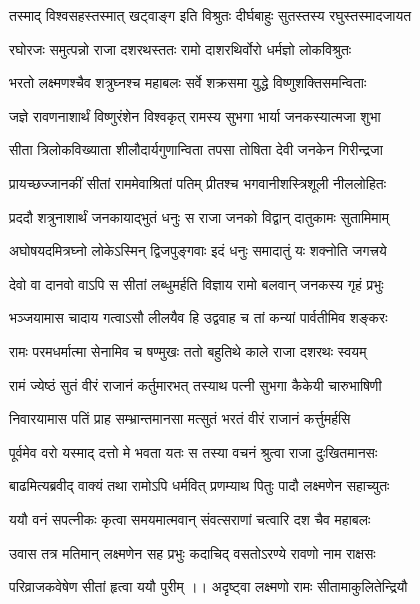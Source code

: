 \twolineshloka
{तस्माद् विश्वसहस्तस्मात् खट्वाङ्ग इति विश्रुतः}
{दीर्घबाहुः सुतस्तस्य रघुस्तस्मादजायत} %

\twolineshloka
{रघोरजः समुत्पन्नो राजा दशरथस्ततः}
{रामो दाशरथिर्वोरो धर्मज्ञो लोकविश्रुतः} %

\twolineshloka
{भरतो लक्ष्मणश्चैव शत्रुघ्नश्च महाबलः}
{सर्वे शक्रसमा युद्धे विष्णुशक्तिसमन्विताः} %

\twolineshloka
{जज्ञे रावणनाशार्थं विष्णुरंशेन विश्वकृत्}
{रामस्य सुभगा भार्या जनकस्यात्मजा शुभा} %

\twolineshloka
{सीता त्रिलोकविख्याता शीलौदार्यगुणान्विता}
{तपसा तोषिता देवी जनकेन गिरीन्द्रजा} %

\twolineshloka
{प्रायच्छज्जानकीं सीतां राममेवाश्रितां पतिम्}
{प्रीतश्च भगवानीशस्त्रिशूली नीललोहितः} %

\twolineshloka
{प्रददौ शत्रुनाशार्थं जनकायाद्‌भुतं धनुः}
{स राजा जनको विद्वान् दातुकामः सुतामिमाम्} %

\twolineshloka
{अघोषयदमित्रघ्नो लोकेऽस्मिन् द्विजपुङ्गवाः}
{इदं धनुः समादातुं यः शक्नोति जगत्त्रये} %

\twolineshloka
{देवो वा दानवो वाऽपि स सीतां लब्धुमर्हति}
{विज्ञाय रामो बलवान् जनकस्य गृहं प्रभुः} %

\twolineshloka
{भञ्जयामास चादाय गत्वाऽसौ लीलयैव हि}
{उद्ववाह च तां कन्यां पार्वतीमिव शङ्करः} %

\twolineshloka
{रामः परमधर्मात्मा सेनामिव च षण्मुखः}
{ततो बहुतिथे काले राजा दशरथः स्वयम्} %

\twolineshloka
{रामं ज्येष्ठं सुतं वीरं राजानं कर्तुमारभत्}
{तस्याथ पत्नी सुभगा कैकेयी चारुभाषिणी} %

\twolineshloka
{निवारयामास पतिं प्राह सम्भ्रान्तमानसा}
{मत्सुतं भरतं वीरं राजानं कर्त्तुमर्हसि} %

\twolineshloka
{पूर्वमेव वरो यस्माद् दत्तो मे भवता यतः}
{स तस्या वचनं श्रुत्वा राजा दुःखितमानसः} %

\twolineshloka
{बाढमित्यब्रवीद् वाक्यं तथा रामोऽपि धर्मवित्}
{प्रणम्याथ पितुः पादौ लक्ष्मणेन सहाच्युतः} %

\twolineshloka
{ययौ वनं सपत्नीकः कृत्वा समयमात्मवान्}
{संवत्सराणां चत्वारि दश चैव महाबलः} %

\twolineshloka
{उवास तत्र मतिमान् लक्ष्मणेन सह प्रभुः}
{कदाचिद् वसतोऽरण्ये रावणो नाम राक्षसः} %

\twolineshloka
{परिव्राजकवेषेण सीतां हृत्वा ययौ पुरीम् ।।}
{अदृष्ट्वा लक्ष्मणो रामः सीतामाकुलितेन्द्रियौ} %

